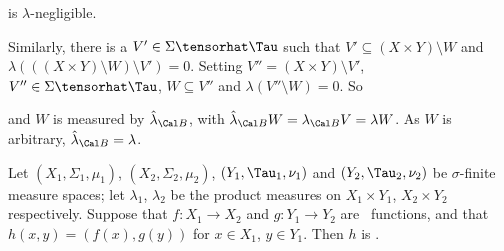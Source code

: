 {\noindent is $\lambda$-negligible.\ \Qed

Similarly, there is a $V'\in\Sigma\tensorhat\Tau$ such that
$V'\subseteq(X\times Y)\setminus W$ and
$\lambda(((X\times Y)\setminus W)\setminus V')=0$.   Setting $V''=(X\times Y)\setminus V'$,
$V''\in\Sigma\tensorhat\Tau$, $W\subseteq V''$ and
$\lambda(V''\setminus W)=0$.   So


\noindent and $W$ is measured by $\hat\lambda_{\Cal B}$, with
$\hat\lambda_{\Cal B}W=\lambda_{\Cal B}V=\lambda W$.   As $W$ is
arbitrary, $\hat\lambda_{\Cal B}=\lambda$.
}%

Let $(X_1,\Sigma_1,\mu_1)$, $(X_2,\Sigma_2,\mu_2)$,
$(Y_1,\Tau_1,\nu_1)$ and $(Y_2,\Tau_2,\nu_2)$ be $\sigma$-finite
measure spaces;  let
$\lambda_1$, $\lambda_2$ be the product measures on $X_1\times Y_1$,
$X_2\times Y_2$ respectively.   Suppose that $f:X_1\to X_2$ and
$g:Y_1\to Y_2$ are \imp\ functions, and that
$h(x,y)=(f(x),g(y))$ for $x\in X_1$, $y\in Y_1$.   Then $h$ is \imp.

